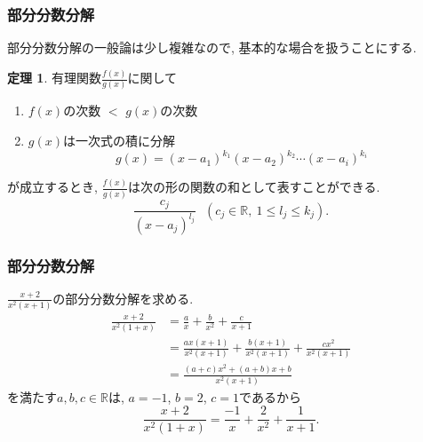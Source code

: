 \documentclass[dvipdfmx,cjk,10.2pt]{beamer}
\newcommand{\R}{\mathbb{R}}
\theoremstyle{definition}
\newtheorem{Thm}{定理}[section]
\begin{document}



\begin{frame}
\frametitle{部分分数分解}

部分分数分解の一般論は少し複雑なので, 基本的な場合を扱うことにする. 

\begin{Thm} \label{部分分数分解定理}
有理関数$\frac{f(x)}{g(x)}$に関して
\begin{enumerate}
\item $f(x)$の次数 $<$  $g(x)$の次数
\item $g(x)$は一次式の積に分解
$$
g(x)=(x-a_1)^{k_1}(x-a_2)^{k_2} \cdots (x-a_i)^{k_i}
$$
\end{enumerate}
が成立するとき, 
$\frac{f(x)}{g(x)}$は次の形の関数の和として表すことができる. 
$$
\frac{c_j}{(x-a_j)^{l_j}} \ \ \ (c_j \in \R, \ 1 \le l_j \le k_j). 
$$
\end{Thm}

\end{frame}






\begin{frame}
\frametitle{部分分数分解}

$\frac{x+2}{x^2(x+1)}$の部分分数分解を求める. 
\begin{align*}
\frac{x+2}{x^2(1+x)} & = \frac{a}{x}+  \frac{b}{x^2}+ \frac{c}{x+1} \\
& = \frac{ax(x+1)}{x^2(x+1)}+  \frac{b(x+1)}{x^2(x+1)}+ \frac{cx^2}{x^2(x+1)} \\
& = \frac{(a+c)x^2+(a+b)x+b}{x^2(x+1)}
\end{align*}
を満たす$a,b,c \in \R$は, $a=-1$, $b=2$, $c=1$であるから
$$
\frac{x+2}{x^2(1+x)} 
=  \frac{-1}{x}+  \frac{2}{x^2}+ \frac{1}{x+1}. 
$$

\end{frame}



\end{document}
